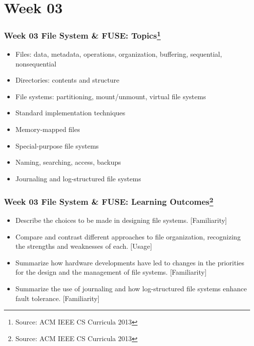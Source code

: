 
\section{Week 03}
\begin{frame}[fragile]
\frametitle{Week 03 File System \& FUSE:
Topics\footnote{Source: ACM IEEE CS Curricula 2013}}

\begin{itemize}
\item Files: data, metadata, operations, organization, buffering, sequential, nonsequential
\item Directories: contents and structure
\item File systems: partitioning, mount/unmount, virtual file systems
\item Standard implementation techniques
\item Memory-mapped files
\item Special-purpose file systems
\item Naming, searching, access, backups
\item Journaling and log-structured file systems
\end{itemize}
\end{frame}

\begin{frame}[fragile]
\frametitle{Week 03 File System \& FUSE:
Learning Outcomes\footnote{Source: ACM IEEE CS Curricula 2013}}
\begin{itemize}
\item Describe the choices to be made in designing file systems. [Familiarity]
\item Compare and contrast different approaches to file organization, recognizing the strengths and weaknesses of each. [Usage]
\item Summarize how hardware developments have led to changes in the priorities for the design and the management of file systems. [Familiarity]
\item Summarize the use of journaling and how log-structured file systems enhance fault tolerance. [Familiarity]
\end{itemize}

\end{frame}

